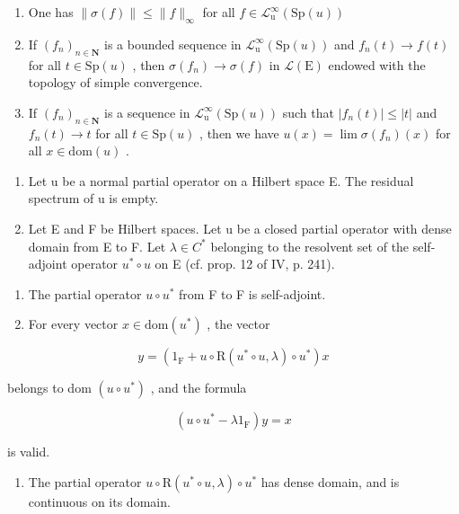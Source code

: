 \begin{enumerate}
\def\labelenumi{(\roman{enumi})}
\item
  One has \(\| \sigma (f)\| \leqslant \| f\|_{\infty}\) for all \(f\in \mathcal{L}_{\mathrm{u}}^{\infty}(\mathrm{Sp}(u))\)
\item
  If \((f_n)_{n\in \mathbf{N}}\) is a bounded sequence in \(\mathcal{L}_{\mathrm{u}}^{\infty}(\mathrm{Sp}(u))\) and \(f_{n}(t)\to f(t)\) for all \(t\in \mathrm{Sp}(u)\) , then \(\sigma (f_n)\rightarrow \sigma (f)\) in \(\mathcal{L}(\mathrm{E})\) endowed with the topology of simple convergence.
\item
  If \((f_n)_{n\in \mathbf{N}}\) is a sequence in \(\mathcal{L}_{\mathrm{u}}^{\infty}(\mathrm{Sp}(u))\) such that \(|f_n(t)|\leqslant |t|\) and \(f_{n}(t)\to t\) for all \(t\in \mathrm{Sp}(u)\) , then we have \(u(x) = \lim \sigma (f_n)(x)\) for all \(x\in \mathrm{dom}(u)\) .
\end{enumerate}

\begin{enumerate}
\def\labelenumi{\arabic{enumi})}
\setcounter{enumi}{4}
\item
  Let u be a normal partial operator on a Hilbert space E. The residual spectrum of u is empty.
\item
  Let E and F be Hilbert spaces. Let u be a closed partial operator with dense domain from E to F. Let \(\lambda \in C^{*}\) belonging to the resolvent set of the self-adjoint operator \(u^{*} \circ u\) on E (cf. prop. 12 of IV, p. 241).
\end{enumerate}

\begin{enumerate}
\def\labelenumi{\alph{enumi})}
\item
  The partial operator \(u \circ u^{*}\) from F to F is self-adjoint.
\item
  For every vector \(x \in \mathrm{dom}(u^{*})\) , the vector
\end{enumerate}

\[
y = (1 _ {\mathrm{F}} + u \circ \mathrm{R} (u ^ {*} \circ u, \lambda) \circ u ^ {*}) x
\]

belongs to dom \((u\circ u^{*})\) , and the formula

\[
(u \circ u ^ {*} - \lambda 1 _ {\mathrm{F}}) y = x
\]

is valid.

\begin{enumerate}
\def\labelenumi{\alph{enumi})}
\setcounter{enumi}{2}
\tightlist
\item
  The partial operator \(u \circ \mathrm{R}(u^* \circ u, \lambda) \circ u^*\) has dense domain, and is continuous on its domain.
\end{enumerate}

